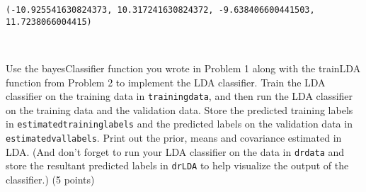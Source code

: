 \documentclass[11pt]{article}
\makeatletter
\newcommand{\boxspacing}{\kern\kvtcb@left@rule\kern\kvtcb@boxsep}
\newcommand{\prompt}[4]{
        \ttfamily\llap{{\color{#2}[#3]:\hspace{3pt}#4}}\vspace{-\baselineskip}
    }
\makeatother
\begin{document}
            \begin{tcolorbox}[breakable, size=fbox, boxrule=.5pt, pad at break*=1mm, opacityfill=0]
\prompt{Out}{outcolor}{11}{\boxspacing}
\begin{Verbatim}[commandchars=\\\{\}]
(-10.925541630824373, 10.317241630824372, -9.638406600441503, 11.7238066004415)
\end{Verbatim}
\end{tcolorbox}
        
    \begin{center}
    \end{center}
    { \hspace*{\fill} \\}
    
    Use the bayesClassifier function you wrote in Problem 1 along with the
trainLDA function from Problem 2 to implement the LDA classifier. Train
the LDA classifier on the training data in \texttt{trainingdata}, and
then run the LDA classifier on the training data and the validation
data. Store the predicted training labels in
\texttt{estimatedtraininglabels} and the predicted labels on the
validation data in \texttt{estimatedvallabels}. Print out the prior,
means and covariance estimated in LDA. (And don't forget to run your LDA
classifier on the data in \texttt{drdata} and store the resultant
predicted labels in \texttt{drLDA} to help visualize the output of the
classifier.) (5 points)
\end{document}
